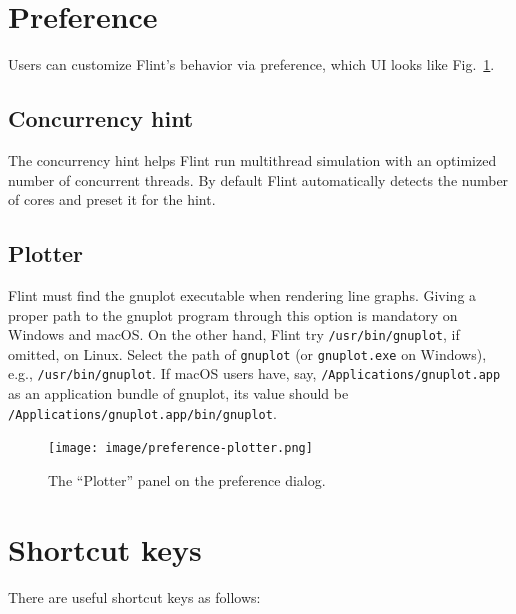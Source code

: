 \documentclass[a4paper,10pt]{report}
\begin{document}
\section{\label{orgae6be62}Preference}
\label{sec:org5c6a94d}
Users can customize Flint's behavior via preference, which UI looks like
Fig.~\ref{fig:org54dc5e6}.

\subsection{Concurrency hint}
\label{sec:org7cba504}
The concurrency hint helps Flint run multithread simulation with an optimized number
of concurrent threads. By default Flint automatically detects the number of cores and
preset it for the hint.

\subsection{Plotter}
\label{sec:org8f80911}
Flint must find the gnuplot executable when rendering line graphs.
Giving a proper path to the gnuplot program through this option is mandatory on
Windows and macOS. On the other hand, Flint try \texttt{/usr/bin/gnuplot}, if
omitted, on Linux.
Select the path of \texttt{gnuplot} (or \texttt{gnuplot.exe} on Windows), e.g.,
\texttt{/usr/bin/gnuplot}. If macOS users have, say,
\texttt{/Applications/gnuplot.app} as an application bundle of gnuplot,
its value should be \texttt{/Applications/gnuplot.app/bin/gnuplot}.

\begin{figure}[htbp]
\centering
\texttt{[image: image/preference-plotter.png]}
\caption{\label{fig:org54dc5e6}The ``Plotter'' panel on the preference dialog.}
\end{figure}

\section{Shortcut keys}
\label{sec:org479a40e}
There are useful shortcut keys as follows:
\end{document}

